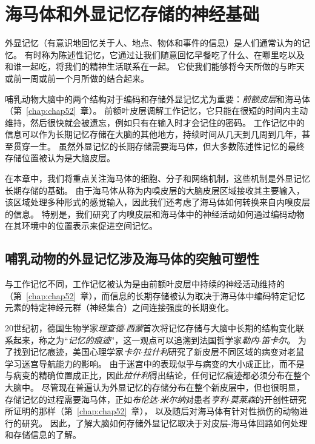 \chapter{海马体和外显记忆存储的神经基础} \label{chap:chap54}

外显记忆（有意识地回忆关于人、地点、物体和事件的信息）是人们通常认为的记忆。
有时称为陈述性记忆，它通过让我们随意回忆早餐吃了什么、在哪里吃以及和谁一起吃，将我们的精神生活联系在一起。
它使我们能够将今天所做的与昨天或前一周或前一个月所做的结合起来。


哺乳动物大脑中的两个结构对于编码和存储外显记忆尤为重要：\textit{前额皮层}和海马体（第~\ref{chap:chap52}~章）。
前额叶皮层调解工作记忆，它只能在很短的时间内主动维持，然后很快就会被遗忘，例如只有在输入时才会记住的密码。
工作记忆中的信息可以作为长期记忆存储在大脑的其他地方，持续时间从几天到几周到几年，甚至贯穿一生。
虽然外显记忆的长期存储需要海马体，但大多数陈述性记忆的最终存储位置被认为是大脑皮层。


在本章中，我们将重点关注海马体的细胞、分子和网络机制，这些机制是外显记忆长期存储的基础。
由于海马体从称为内嗅皮层的大脑皮层区域接收其主要输入，该区域处理多种形式的感觉输入，因此我们还考虑了海马体如何转换来自内嗅皮层的信息。
特别是，我们研究了内嗅皮层和海马体中的神经活动如何通过编码动物在其环境中的位置表示来促进空间记忆。



\section{哺乳动物的外显记忆涉及海马体的突触可塑性}

与工作记忆不同，工作记忆被认为是由前额叶皮层中持续的神经活动维持的（第~\ref{chap:chap52}~章），而信息的长期存储被认为取决于海马体中编码特定记忆元素的特定神经元群（神经集合）之间连接强度的长期变化。


20世纪初，德国生物学家\textit{理查德$\cdot$西蒙}首次将记忆存储与大脑中长期的结构变化联系起来，称之为“\textit{记忆的痕迹}”，这一观点可以追溯到法国哲学家\textit{勒内$\cdot$笛卡尔}。
为了找到记忆痕迹，美国心理学家\textit{卡尔$\cdot$拉什利}研究了新皮层不同区域的病变对老鼠学习迷宫导航能力的影响。
由于迷宫中的表现似乎与病变的大小成正比，而不是与病变的精确位置成正比，因此\textit{拉什利}得出结论，任何记忆痕迹都必须分布在整个大脑中。
尽管现在普遍认为外显记忆的存储分布在整个新皮层中，但也很明显，存储记忆的过程需要海马体，正如\textit{布伦达$\cdot$米尔纳}对患者\textit{亨利$\cdot$莫莱森}的开创性研究所证明的那样（第~\ref{chap:chap52}~章），
以及随后对海马体有针对性损伤的动物进行的研究。
因此，了解大脑如何存储外显记忆取决于对皮层-海马体回路如何处理和存储信息的了解。


